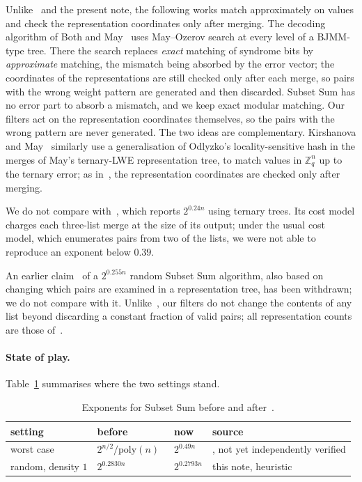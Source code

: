 \documentclass[11pt]{article}
\theoremstyle{definition}
\theoremstyle{remark}
\newcommand{\Z}{\mathbb{Z}}
\newcommand{\status}[1]{}   %
\begin{document}
Unlike~\cite{Oze16} and the present note, the following works match approximately on values and check the
representation coordinates only after merging. The decoding algorithm of Both and
May~\cite{BM18} uses May--Ozerov search at every level of a BJMM-type tree. There the search replaces
\emph{exact} matching of syndrome bits by \emph{approximate} matching, the mismatch being absorbed by the error
vector; the coordinates of the representations are still checked only after each merge, so pairs with the wrong
weight pattern are generated and then discarded. Subset Sum has no error part to absorb a mismatch, and we keep
exact modular matching. Our filters act on the representation coordinates themselves, so the pairs with the wrong
pattern are never generated. The two ideas are complementary. Kirshanova and May~\cite{KM21} similarly use a
generalisation of Odlyzko's locality-sensitive hash in the merges of May's ternary-LWE representation tree, to match
values in $\Z_q^n$ up to the ternary error; as in~\cite{BM18}, the representation coordinates are checked only after
merging.

We do not compare with~\cite{Li25}, which reports $2^{0.24n}$ using ternary trees. Its cost model charges each
three-list merge at the size of its output; under the usual cost model, which enumerates pairs from two of the
lists, we were not able to reproduce an exponent below $0.39$.
\status{numerical; script ter\_honest.py (not included in the paper)}

An earlier claim~\cite{EM19} of a $2^{0.255n}$ random Subset Sum algorithm, also based on changing which
pairs are examined in a representation tree, has been withdrawn; we do not compare with it. Unlike~\cite{EM19},
our filters do not change the contents of any list beyond discarding a constant fraction of valid pairs; all
representation counts are those of~\cite{BBSS20}.

\paragraph{State of play.} Table~\ref{tab:state} summarises where the two settings stand.
\begin{table}[ht]
\centering
\begin{tabular}{llll}
\toprule
setting & before & now & source \\
\midrule
worst case & $2^{n/2}/\mathrm{poly}(n)$~\cite{CJRS23} & $2^{0.49n}$ & \cite{OAI26}, not yet independently verified \\
random, density $1$ & $2^{0.2830n}$~\cite{BBSS20} & $2^{0.2793n}$ & this note, heuristic \\
\bottomrule
\end{tabular}
\caption{Exponents for Subset Sum before and after~\cite{OAI26}.}
\label{tab:state}
\end{table}
\end{document}
